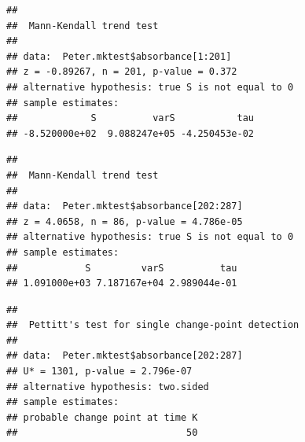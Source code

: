 \documentclass[12pt,]{article}
\newenvironment{Shaded}{\begin{snugshade}}{\end{snugshade}}
\newcommand{\KeywordTok}[1]{\textcolor[rgb]{0.13,0.29,0.53}{\textbf{#1}}}
\newcommand{\DecValTok}[1]{\textcolor[rgb]{0.00,0.00,0.81}{#1}}
\newcommand{\CommentTok}[1]{\textcolor[rgb]{0.56,0.35,0.01}{\textit{#1}}}
\newcommand{\OperatorTok}[1]{\textcolor[rgb]{0.81,0.36,0.00}{\textbf{#1}}}
\newcommand{\NormalTok}[1]{#1}
\begin{document}
\begin{verbatim}
## 
##  Mann-Kendall trend test
## 
## data:  Peter.mktest$absorbance[1:201]
## z = -0.89267, n = 201, p-value = 0.372
## alternative hypothesis: true S is not equal to 0
## sample estimates:
##             S          varS           tau 
## -8.520000e+02  9.088247e+05 -4.250453e-02
\end{verbatim}

\begin{Shaded}
\end{Shaded}

\begin{verbatim}
## 
##  Mann-Kendall trend test
## 
## data:  Peter.mktest$absorbance[202:287]
## z = 4.0658, n = 86, p-value = 4.786e-05
## alternative hypothesis: true S is not equal to 0
## sample estimates:
##            S         varS          tau 
## 1.091000e+03 7.187167e+04 2.989044e-01
\end{verbatim}

\begin{Shaded}
\end{Shaded}

\begin{verbatim}
## 
##  Pettitt's test for single change-point detection
## 
## data:  Peter.mktest$absorbance[202:287]
## U* = 1301, p-value = 2.796e-07
## alternative hypothesis: two.sided
## sample estimates:
## probable change point at time K 
##                              50
\end{verbatim}

\begin{Shaded}
\end{Shaded}
\end{document}

